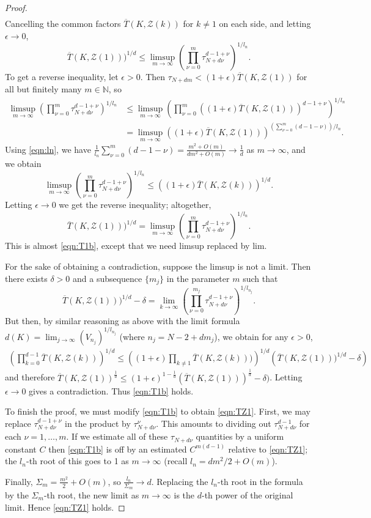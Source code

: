 \documentclass[10pt,a4paper]{amsart}
\newcommand{\N}{\mathbb{N}}
\newcommand{\calZ}{\mathcal{Z}}
\begin{document}
\begin{proof}
$$\begin{aligned}
\end{aligned}$$  Cancelling the common factors $\overline T(K,\calZ(k))$ for $k\neq 1$ on each side, and letting $\epsilon\to 0$, 
$$
\overline T(K,\calZ(1)))^{1/d} \leq \limsup_{m\to\infty}\left(\prod_{\nu=0}^m \tau_{N+d\nu}^{d-1+\nu} \right)^{1/l_n}.
$$
To get  a reverse inequality, let $\epsilon>0$.  Then $\tau_{N+dm}<(1+\epsilon)\overline T(K,\calZ(1))$ for all but finitely many $m\in\N$, so  
$$\begin{aligned}
\limsup_{m\to\infty}\left(\prod_{\nu=0}^m \tau_{N+d\nu}^{d-1+\nu} \right)^{1/l_n} &\leq \limsup_{m\to\infty}  \left(\prod_{\nu=0}^m ((1+\epsilon)\overline T(K,\calZ(1)))^{d-1+\nu}  \right)^{1/l_n} \\
& =    \limsup_{m\to\infty}\left( (1+\epsilon)\overline T(K,\calZ(1)) \right)^{\left(\sum_{\nu=0}^{m}(d-1-\nu)\right)/l_n }.
\end{aligned}$$ 
Using \eqref{eqn:ln}, we have  $\frac{1}{l_n}\sum_{\nu=0}^{m}(d-1-\nu)= \frac{m^2+O(m)}{dm^2+O(m)}\to \frac{1}{ d}$  as $m\to\infty$,  
 and we obtain  $$\limsup\limits_{m\to\infty}\left(\prod_{\nu=0}^m \tau_{N+d\nu}^{d-1+\nu} \right)^{1/l_n}\leq \left((1+\epsilon)\overline T(K,\calZ(k))\right)^{1/d}.$$  Letting $\epsilon\to 0$ we get the reverse inequality; altogether, 
$$
\overline T(K,\calZ(1)))^{1/d} = \limsup_{m\to\infty}\left(\prod_{\nu=0}^m \tau_{N+d\nu}^{d-1+\nu} \right)^{1/l_n}.
$$
This is almost \eqref{eqn:T1b}, except that we need limsup replaced by lim.  

For the sake of obtaining a contradiction, suppose the limsup is not a limit. Then there exists $\delta>0$ and 
a subsequence $\{m_j\}$ in the parameter $m$ such that 
$$
\overline T(K,\calZ(1)))^{1/d}-\delta = \lim_{k\to\infty} \left(\prod_{\nu=0}^{m_j} \tau_{N+d\nu}^{d-1+\nu} \right)^{1/l_{n_j}}.
$$
But then, by similar reasoning as above with the limit formula $d(K)=\lim_{j\to\infty} (V_{n_j})^{1/l_{n_j}}$ (where $n_j=N-2+dm_j$),  we obtain for any $\epsilon>0$, 
$$\begin{aligned}
\left(\prod_{k=0}^{d-1} \overline T(K,\calZ(k))\right)^{1/d}  
 \leq \left((1+\epsilon)\prod_{k\neq 1} \overline T(K,\calZ(k)))\right)^{1/d}  
\left(\overline T(K,\calZ(1)))^{1/d}-\delta\right)
\end{aligned}$$
and therefore $\overline T(K,\calZ(1))^{\frac{1}{d}}\leq (1+\epsilon)^{1-\frac{1}{d}}(\overline T(K,\calZ(1)))^{\frac{1}{d}}-\delta )$.  
Letting $\epsilon\to 0$ gives a contradiction.  Thus \eqref{eqn:T1b} holds.  

To finish the proof, we must modify \eqref{eqn:T1b} to obtain \eqref{eqn:TZ1}.  First, we may replace  $\tau_{N+d\nu}^{d-1+\nu}$ in the product by  $\tau_{N+d\nu}^{\nu}$. This amounts to dividing out $\tau_{N+d\nu}^{d-1}$ for each $\nu=1,\ldots,m$.  If we estimate all of these $\tau_{N+d\nu}$ quantities by a uniform constant $C$ then  \eqref{eqn:T1b} is off by an estimated $C^{m(d-1)}$  relative to \eqref{eqn:TZ1}; the $l_n$-th root of this goes to 1 as $m\to\infty$  (recall $l_n=dm^2/2+O(m)$).  

Finally,  $\Sigma_m= \frac{m^2}{2}+O(m)$, so $\frac{l_n}{\Sigma_m}\to d$.  Replacing the $l_n$-th root in the formula by the $\Sigma_m$-th root,  the new limit as $m\to\infty$ is the $d$-th power of the original limit.  Hence \eqref{eqn:TZ1} holds.  
\end{proof}
\end{document}
